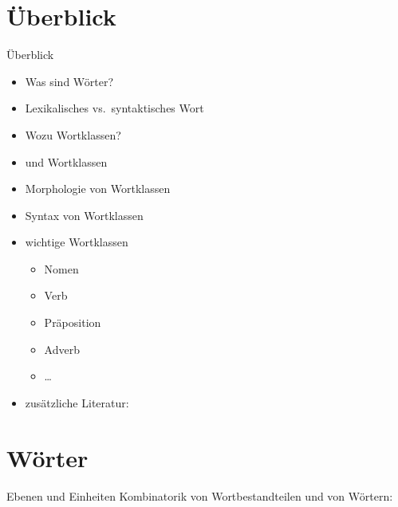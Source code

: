 \section{Überblick}

\begin{frame}
  {Überblick}
  \pause
  \begin{itemize}[<+->]
    \item Was sind Wörter?
    \item Lexikalisches vs.\ syntaktisches Wort
      \Halbzeile
    \item Wozu Wortklassen?
    \item {} und Wortklassen
    \item \alert{Morphologie} von Wortklassen
    \item \alert{Syntax} von Wortklassen
      \Halbzeile
    \item wichtige Wortklassen
      \begin{itemize}[<+->]
        \item Nomen
        \item Verb
        \item Präposition
        \item Adverb
        \item \ldots
      \end{itemize}
      \Halbzeile
    \item zusätzliche Literatur: \citet{Engel2009}
  \end{itemize}
\end{frame}


\section{Wörter}

\begin{frame}
  {Ebenen und Einheiten}
  \pause
  Kombinatorik von Wortbestandteilen und von Wörtern:
  \pause
  \Zeile
  \begin{exe}
    \ex
    \begin{xlist}
      \pause
    \end{xlist}
    \pause
    \Zeile
    \ex
    \begin{xlist}
      \pause
    \end{xlist}
  \end{exe}
\end{frame}

